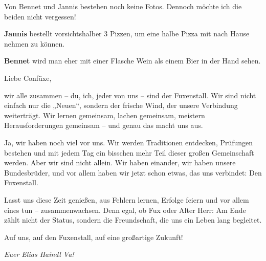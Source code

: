 \begin{multicols}{2}


Von Bennet und Jannis bestehen noch keine Fotos. Dennoch möchte
ich die beiden nicht vergessen!



\textbf{Jannis} bestellt vorsichtshalber 3 Pizzen, um eine halbe
Pizza mit nach Hause nehmen zu können.



\textbf{Bennet} wird man eher mit einer Flasche Wein als einem Bier
in der Hand sehen.

\newpage

Liebe Confüxe,



wir alle
zusammen – du, ich, jeder von uns – sind der Fuxenstall. Wir sind nicht einfach
nur die „Neuen“,
sondern der frische Wind, der unsere Verbindung weiterträgt. Wir lernen
gemeinsam, lachen gemeinsam, meistern Herausforderungen gemeinsam – und genau
das macht uns aus.



Ja, wir haben
noch viel vor uns. Wir werden Traditionen entdecken, Prüfungen bestehen und mit
jedem Tag ein bisschen mehr Teil dieser großen Gemeinschaft werden. Aber wir
sind nicht allein. Wir haben einander, wir haben unsere Bundesbrüder, und vor
allem haben wir jetzt schon etwas, das uns verbindet: Den Fuxenstall.



Lasst uns diese
Zeit genießen, aus Fehlern lernen, Erfolge feiern und vor allem eines tun – zusammenwachsen.
Denn egal, ob Fux oder Alter Herr: Am Ende zählt nicht der Status, sondern die
Freundschaft, die uns ein Leben lang begleitet.



Auf uns, auf den
Fuxenstall, auf eine großartige Zukunft!






	\begin{flushright}
		\hfill\emph{Euer Elias Haindl Va!}
	\end{flushright}
\end{multicols}


